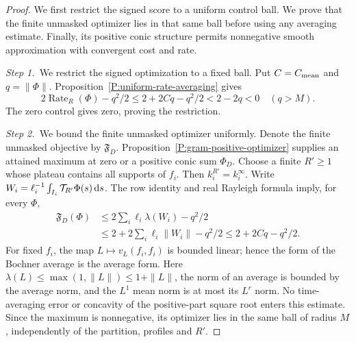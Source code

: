 \begin{proof}
  We first restrict the signed score to a uniform control ball. We prove that
  the finite unmasked optimizer lies in that same ball before using any
  averaging estimate. Finally, its positive conic structure permits
  nonnegative smooth approximation with convergent cost and rate.


  \medskip
  \noindent\textit{Step 1.~}We restrict the signed optimization to a fixed
  ball.
  Put $C = C_{\rm mean}$ and $q = \|\Phi\|$.
  Proposition~\ref{P:uniform-rate-averaging} gives
  \[
    2\operatorname{Rate}_R(\Phi)-q^2/2
    \le2+2Cq-q^2/2<2-2q<0\quad(q>M).
  \]
  The zero control gives zero, proving the restriction.


  \medskip
  \noindent\textit{Step 2.~}We bound the finite unmasked optimizer uniformly.
  Denote the finite unmasked objective by $\mathfrak{F}_D$.
  Proposition~\ref{P:gram-positive-optimizer} supplies an attained maximum at
  zero or a positive conic sum $\Phi_D$. Choose a finite $R' \ge 1$ whose
  plateau contains all supports of $f_i$. Then $k_i^{R'} = k_i^\infty$. Write
  $W_i = \ell_i^{-1}\int_{I_i}\mathcal{T}_{R'}\Phi(s)\,\mathrm{d} s$. The row identity
  and real Rayleigh formula imply, for every $\Phi$,
  \begin{align*}
    \mathfrak{F}_D(\Phi)
    &\le2\sum_i\ell_i\lambda(W_i)-q^2/2\\
    &\le2+2\sum_i\ell_i\|W_i\|-q^2/2
    \le2+2Cq-q^2/2 .
  \end{align*}
  For fixed $f_i$, the map $L\mapsto v_L(f_i,f_i)$ is bounded linear; hence the
  form of the Bochner average is the average form. Here $\lambda(L) \le
  \max(1,\|L\|) \le 1+\|L\|$, the norm of an average is bounded by the average
  norm, and the $L^1$ mean norm is at most its $L^r$ norm. No time-averaging
  error or concavity of the positive-part square root enters this estimate.
  Since the maximum is nonnegative, its optimizer lies in the same ball of
  radius $M$, independently of the partition, profiles and $R'$.



\end{proof}

